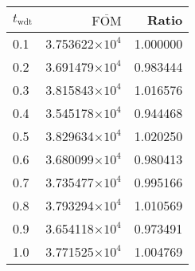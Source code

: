 \begin{tabular}{lrr}
\toprule
$t_{\mathrm{wdt}}$ & $\overline{\mathrm{FOM}}$ &    Ratio \\
\midrule
               0.1 &   3.753622$\times 10^{4}$ & 1.000000 \\
               0.2 &   3.691479$\times 10^{4}$ & 0.983444 \\
               0.3 &   3.815843$\times 10^{4}$ & 1.016576 \\
               0.4 &   3.545178$\times 10^{4}$ & 0.944468 \\
               0.5 &   3.829634$\times 10^{4}$ & 1.020250 \\
               0.6 &   3.680099$\times 10^{4}$ & 0.980413 \\
               0.7 &   3.735477$\times 10^{4}$ & 0.995166 \\
               0.8 &   3.793294$\times 10^{4}$ & 1.010569 \\
               0.9 &   3.654118$\times 10^{4}$ & 0.973491 \\
               1.0 &   3.771525$\times 10^{4}$ & 1.004769 \\
\bottomrule
\end{tabular}
